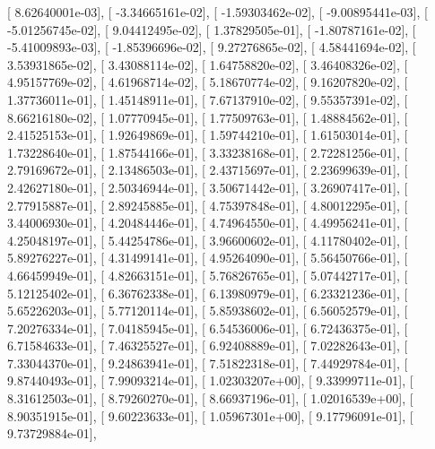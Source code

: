\documentclass{article}
\begin{document}
       [  8.62640001e-03],
       [ -3.34665161e-02],
       [ -1.59303462e-02],
       [ -9.00895441e-03],
       [ -5.01256745e-02],
       [  9.04412495e-02],
       [  1.37829505e-01],
       [ -1.80787161e-02],
       [ -5.41009893e-03],
       [ -1.85396696e-02],
       [  9.27276865e-02],
       [  4.58441694e-02],
       [  3.53931865e-02],
       [  3.43088114e-02],
       [  1.64758820e-02],
       [  3.46408326e-02],
       [  4.95157769e-02],
       [  4.61968714e-02],
       [  5.18670774e-02],
       [  9.16207820e-02],
       [  1.37736011e-01],
       [  1.45148911e-01],
       [  7.67137910e-02],
       [  9.55357391e-02],
       [  8.66216180e-02],
       [  1.07770945e-01],
       [  1.77509763e-01],
       [  1.48884562e-01],
       [  2.41525153e-01],
       [  1.92649869e-01],
       [  1.59744210e-01],
       [  1.61503014e-01],
       [  1.73228640e-01],
       [  1.87544166e-01],
       [  3.33238168e-01],
       [  2.72281256e-01],
       [  2.79169672e-01],
       [  2.13486503e-01],
       [  2.43715697e-01],
       [  2.23699639e-01],
       [  2.42627180e-01],
       [  2.50346944e-01],
       [  3.50671442e-01],
       [  3.26907417e-01],
       [  2.77915887e-01],
       [  2.89245885e-01],
       [  4.75397848e-01],
       [  4.80012295e-01],
       [  3.44006930e-01],
       [  4.20484446e-01],
       [  4.74964550e-01],
       [  4.49956241e-01],
       [  4.25048197e-01],
       [  5.44254786e-01],
       [  3.96600602e-01],
       [  4.11780402e-01],
       [  5.89276227e-01],
       [  4.31499141e-01],
       [  4.95264090e-01],
       [  5.56450766e-01],
       [  4.66459949e-01],
       [  4.82663151e-01],
       [  5.76826765e-01],
       [  5.07442717e-01],
       [  5.12125402e-01],
       [  6.36762338e-01],
       [  6.13980979e-01],
       [  6.23321236e-01],
       [  5.65226203e-01],
       [  5.77120114e-01],
       [  5.85938602e-01],
       [  6.56052579e-01],
       [  7.20276334e-01],
       [  7.04185945e-01],
       [  6.54536006e-01],
       [  6.72436375e-01],
       [  6.71584633e-01],
       [  7.46325527e-01],
       [  6.92408889e-01],
       [  7.02282643e-01],
       [  7.33044370e-01],
       [  9.24863941e-01],
       [  7.51822318e-01],
       [  7.44929784e-01],
       [  9.87440493e-01],
       [  7.99093214e-01],
       [  1.02303207e+00],
       [  9.33999711e-01],
       [  8.31612503e-01],
       [  8.79260270e-01],
       [  8.66937196e-01],
       [  1.02016539e+00],
       [  8.90351915e-01],
       [  9.60223633e-01],
       [  1.05967301e+00],
       [  9.17796091e-01],
       [  9.73729884e-01],
\end{document}
